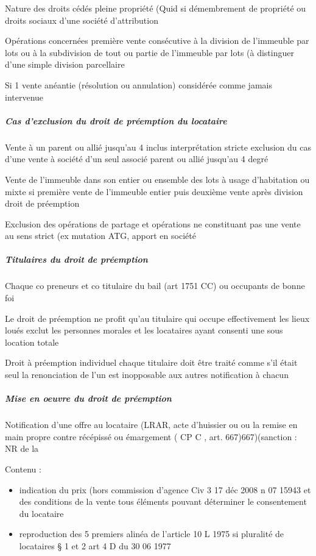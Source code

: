 \documentclass[10pt,a4paper,twoside]{article}
\begin{document}
					Nature des droits cédés pleine propriété (Quid si
					démembrement de propriété ou droits sociaux d’une société
					d’attribution

					Opérations concernées première vente consécutive à la
					division de l’immeuble par lots ou à la subdivision de tout ou
					partie de l’immeuble par lots (à distinguer d’une simple
					division parcellaire

					Si 1\iere{} vente anéantie (résolution ou annulation) considérée
					comme jamais intervenue

				\subparagraph{Cas d’exclusion du droit de préemption du locataire}

					Vente à un parent ou allié jusqu’au 4 inclus interprétation stricte
					exclusion du cas d’une vente à société d’un seul associé parent ou allié
					jusqu’au 4 degré

					Vente de l’immeuble dans son entier ou ensemble des lots à usage
					d’habitation ou mixte si première vente de l’immeuble entier puis deuxième
					vente après division droit de préemption

					Exclusion des opérations de partage et opérations ne constituant pas une
					vente au sens strict (ex mutation ATG, apport en société

				\subparagraph{Titulaires du droit de préemption}

					Chaque co preneurs et co titulaire du bail (art 1751 CC)
					ou occupants de bonne foi

					Le droit de préemption ne profit qu’au titulaire qui occupe
					effectivement les lieux loués exclut les personnes
					morales et les locataires ayant consenti une sous location
					totale

					Droit à préemption individuel chaque titulaire doit être
					traité comme s’il était seul la renonciation de l’un est
					inopposable aux autres notification à chacun

				\subparagraph{Mise en oeuvre du droit de préemption}

					Notification d’une offre au locataire (LRAR, acte d’huissier ou ou
					la remise en main propre contre récépissé ou émargement ( CP C ,
					art. 667)667)(sanction : NR de la

					Contenu :
					\begin{itemize}
						\item indication du prix (hors commission d’agence Civ 3 17 déc
						2008 n 07 15943 et des conditions de la vente tous
						éléments pouvant déterminer le consentement du locataire

						\item reproduction des 5 premiers alinéa de l’article 10 L 1975 si
						pluralité de locataires § 1 et 2 art 4 D du 30 06 1977
					\end{itemize}
\end{document}
